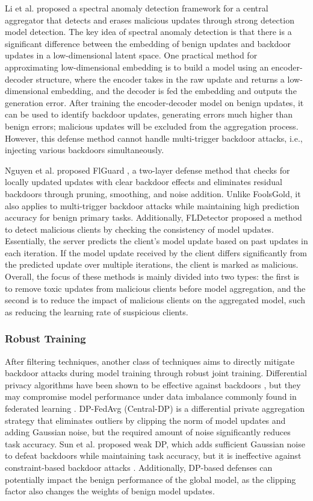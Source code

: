 \documentclass[conference]{IEEEtran}
\begin{document}
Li et al. \cite{b79} proposed a spectral anomaly detection framework for a
central aggregator that detects and erases malicious updates through strong detection model detection.
The key idea of spectral anomaly detection is that there is a significant difference between the embedding
of benign updates and backdoor updates in a low-dimensional latent space. One practical method for approximating
low-dimensional embedding is to build a model using an encoder-decoder structure, where the encoder takes
in the raw update and returns a low-dimensional embedding, and the decoder is fed the embedding and outputs
the generation error.  After training the encoder-decoder model on benign updates, it can be used to identify
backdoor updates, generating errors much higher than benign errors; malicious updates will be excluded from
the aggregation process. However, this defense method cannot handle multi-trigger backdoor attacks, i.e.,
injecting various backdoors simultaneously.

Nguyen et al. proposed FlGuard \cite{b80}, a two-layer defense method that checks
for locally updated updates with clear backdoor effects and eliminates residual backdoors through pruning, smoothing, and noise
addition. Unlike FoolsGold\cite{b78}, it also applies to multi-trigger backdoor attacks while maintaining high prediction accuracy for benign primary tasks.
Additionally, FLDetector \cite{b81} proposed a method to detect malicious clients by checking the consistency of model updates. Essentially,
the server predicts the client's model update based on past updates in each iteration. If the model update received by the client
differs significantly from the predicted update over multiple iterations, the client is marked as malicious. Overall, the focus of
these methods is mainly divided into two types: the first is to remove toxic updates from malicious clients before model aggregation,
and the second is to reduce the impact of malicious clients on the aggregated model, such as reducing the learning rate of suspicious clients.

\subsubsection{Robust Training}
After filtering techniques, another class of techniques aims to directly mitigate backdoor attacks during model training through robust joint training.
Differential privacy algorithms have been shown to be effective against backdoors \cite{b82}, but they may compromise model performance under data imbalance
commonly found in federated learning \cite{b83}. DP-FedAvg \cite{b84} (Central-DP) is a differential private aggregation strategy that eliminates
outliers by clipping the norm of model updates and adding Gaussian noise, but the required amount of noise significantly reduces
task accuracy. Sun et al. \cite{b27} proposed weak DP, which adds sufficient Gaussian noise to defeat backdoors while maintaining task accuracy,
but it is ineffective against constraint-based backdoor attacks \cite{b25}.
Additionally, DP-based defenses can potentially impact the benign performance of the global model,
as the clipping factor also changes the weights of benign model updates.
\end{document}

